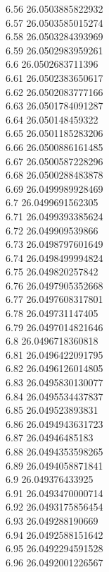 {6.56	26.0503885822932\\
6.57	26.0503585015274\\
6.58	26.0503284393969\\
6.59	26.0502983959261\\
6.6	26.0502683711396\\
6.61	26.0502383650617\\
6.62	26.0502083777166\\
6.63	26.0501784091287\\
6.64	26.050148459322\\
6.65	26.0501185283206\\
6.66	26.0500886161485\\
6.67	26.0500587228296\\
6.68	26.0500288483878\\
6.69	26.0499989928469\\
6.7	26.0499691562305\\
6.71	26.0499393385624\\
6.72	26.049909539866\\
6.73	26.0498797601649\\
6.74	26.0498499994824\\
6.75	26.049820257842\\
6.76	26.0497905352668\\
6.77	26.0497608317801\\
6.78	26.049731147405\\
6.79	26.0497014821646\\
6.8	26.0496718360818\\
6.81	26.0496422091795\\
6.82	26.0496126014805\\
6.83	26.0495830130077\\
6.84	26.0495534437837\\
6.85	26.049523893831\\
6.86	26.0494943631723\\
6.87	26.04946485183\\
6.88	26.0494353598265\\
6.89	26.0494058871841\\
6.9	26.049376433925\\
6.91	26.0493470000714\\
6.92	26.0493175856454\\
6.93	26.049288190669\\
6.94	26.0492588151642\\
6.95	26.0492294591528\\
6.96	26.0492001226567\\
}

